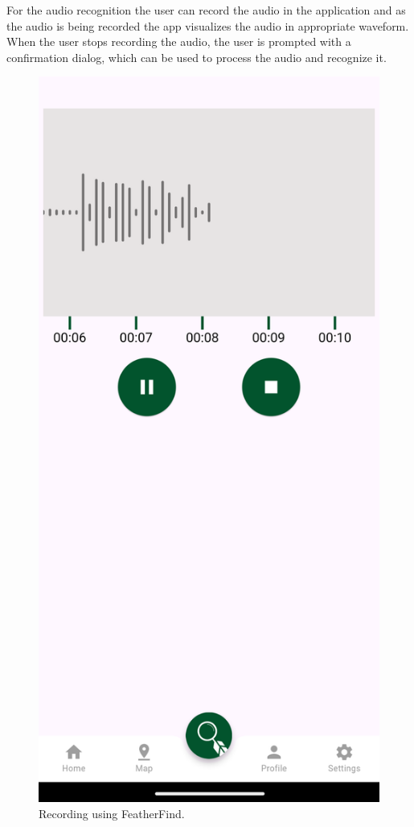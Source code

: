 For the audio recognition the user can record the audio in the application and as the 
audio is being recorded the app visualizes the audio in appropriate waveform. When the user stops
recording the audio, the user is prompted with a confirmation dialog, which can be used to process the 
audio and recognize it.
\begin{figure}[h!]
    \centering
    \includegraphics[scale=0.26]{images/recording.png}
    \caption{Recording using FeatherFind.}
\end{figure}

